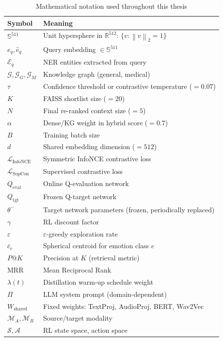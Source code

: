 \documentclass[12pt,a4paper]{article}
\theoremstyle{definition}
\theoremstyle{plain}
\theoremstyle{remark}
\newcommand{\R}{\mathbb{R}}
\newcommand{\Sph}{\mathbb{S}}
\newcommand{\Norm}[1]{\left\|#1\right\|}
\newcommand{\Loss}{\mathcal{L}}
\newcommand{\KG}{\mathcal{G}}
\newcommand{\Qeval}{Q_{\text{eval}}}
\newcommand{\Qtgt}{Q_{\text{tgt}}}
\begin{document}
\begin{table}[H]
\centering
\caption{Mathematical notation used throughout this thesis}
\begin{tabular}{ll}
\toprule
\textbf{Symbol} & \textbf{Meaning} \\
\midrule
$\Sph^{511}$ & Unit hypersphere in $\R^{512}$: $\{v : \Norm{v}_2 = 1\}$ \\
$e_q, \hat{e}_q$ & Query embedding $\in \Sph^{511}$ \\
$\mathcal{E}_q$ & NER entities extracted from query \\
$\KG, \KG_G, \KG_M$ & Knowledge graph (general, medical) \\
$\tau$ & Confidence threshold or contrastive temperature ($= 0.07$) \\
$K$ & FAISS shortlist size ($= 20$) \\
$N$ & Final re-ranked context size ($= 5$) \\
$\alpha$ & Dense/KG weight in hybrid score ($= 0.7$) \\
$B$ & Training batch size \\
$d$ & Shared embedding dimension ($= 512$) \\
$\Loss_{\text{InfoNCE}}$ & Symmetric InfoNCE contrastive loss \\
$\Loss_{\text{SupCon}}$ & Supervised contrastive loss \\
$\Qeval$ & Online Q-evaluation network \\
$\Qtgt$ & Frozen Q-target network \\
$\theta^-$ & Target network parameters (frozen, periodically replaced) \\
$\gamma$ & RL discount factor \\
$\varepsilon$ & $\varepsilon$-greedy exploration rate \\
$\bar{c}_e$ & Spherical centroid for emotion class $e$ \\
$P@K$ & Precision at $K$ (retrieval metric) \\
$\text{MRR}$ & Mean Reciprocal Rank \\
$\lambda(t)$ & Distillation warm-up schedule weight \\
$\Pi$ & LLM system prompt (domain-dependent) \\
$W_{\text{shared}}$ & Fixed weights: TextProj, AudioProj, BERT, Wav2Vec \\
$\mathcal{M}_A, \mathcal{M}_B$ & Source/target modality \\
$\mathcal{S}, \mathcal{A}$ & RL state space, action space \\

\end{tabular}
\end{table}
\end{document}

